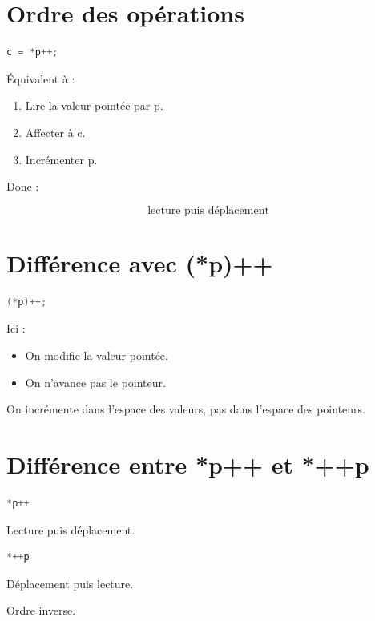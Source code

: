 \section{Ordre des opérations}

\begin{lstlisting}[language=C]
c = *p++;
\end{lstlisting}

Équivalent à :

\begin{enumerate}
\item Lire la valeur pointée par p.
\item Affecter à c.
\item Incrémenter p.
\end{enumerate}

Donc :

\[
\text{lecture puis déplacement}
\]

\section{Différence avec (*p)++}

\begin{lstlisting}[language=C]
(*p)++;
\end{lstlisting}

Ici :

\begin{itemize}
\item On modifie la valeur pointée.
\item On n’avance pas le pointeur.
\end{itemize}

On incrémente dans l’espace des valeurs,
pas dans l’espace des pointeurs.

\section{Différence entre *p++ et *++p}

\begin{lstlisting}[language=C]
*p++
\end{lstlisting}

Lecture puis déplacement.

\begin{lstlisting}[language=C]
*++p
\end{lstlisting}

Déplacement puis lecture.

Ordre inverse.

